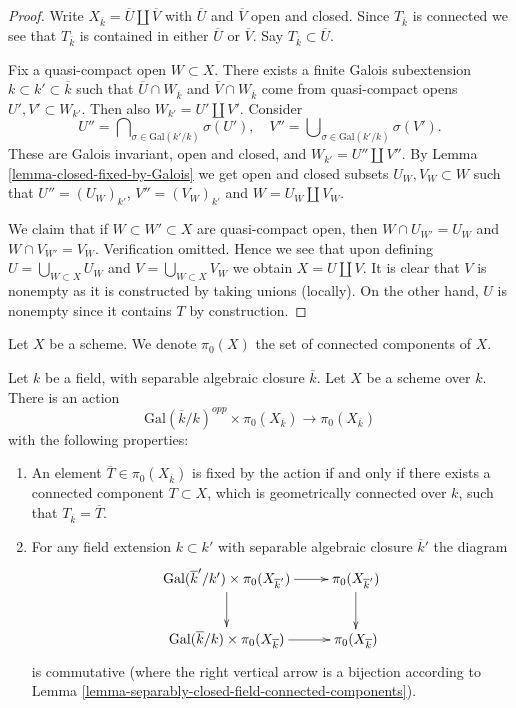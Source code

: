 \begin{proof}
Write $X_{\overline{k}} = \overline{U} \coprod \overline{V}$
with $\overline{U}$ and $\overline{V}$ open and closed.
Since $T_{\overline{k}}$ is connected we see that
$T_{\overline{k}}$ is contained in either $\overline{U}$ or $\overline{V}$.
Say $T_{\overline{k}} \subset \overline{U}$.

\medskip\noindent
Fix a quasi-compact open $W \subset X$. There exists a
finite Galois subextension $k \subset k' \subset \overline{k}$
such that $\overline{U} \cap W_{\overline{k}}$ and
$\overline{V} \cap W_{\overline{k}}$ come from quasi-compact
opens $U', V' \subset W_{k'}$. Then also $W_{k'} = U' \coprod V'$.
Consider
$$
U'' = \bigcap\nolimits_{\sigma \in \text{Gal}(k'/k)} \sigma(U'),
\quad
V'' = \bigcup\nolimits_{\sigma \in \text{Gal}(k'/k)} \sigma(V').
$$
These are Galois invariant, open and closed, and
$W_{k'} = U'' \coprod V''$.
By Lemma \ref{lemma-closed-fixed-by-Galois} we get open and closed subsets
$U_W, V_W \subset W$ such that
$U'' = (U_W)_{k'}$, $V'' = (V_W)_{k'}$ and
$W = U_W \coprod V_W$.

\medskip\noindent
We claim that if $W \subset W' \subset X$ are quasi-compact
open, then $W \cap U_{W'} = U_W$ and $W \cap V_{W'} = V_W$.
Verification omitted.
Hence we see that upon defining $U = \bigcup_{W \subset X} U_W$
and $V = \bigcup_{W \subset X} V_W$ we obtain $X = U \coprod V$.
It is clear that $V$ is nonempty as it is constructed by taking
unions (locally). On the other hand, $U$ is nonempty since it contains
$T$ by construction.
\end{proof}

\noindent
Let $X$ be a scheme. We denote $\pi_0(X)$ the set of connected
components of $X$.

\begin{lemma}
\label{lemma-galois-action-connected-components}
Let $k$ be a field, with separable algebraic closure $\overline{k}$.
Let $X$ be a scheme over $k$.
There is an action
$$
\text{Gal}(\overline{k}/k)^{opp} \times \pi_0(X_{\overline{k}})
\longrightarrow
\pi_0(X_{\overline{k}})
$$
with the following properties:
\begin{enumerate}
\item An element $\overline{T} \in \pi_0(X_{\overline{k}})$
is fixed by the action if and only if there exists a connected component
$T \subset X$, which is geometrically connected over $k$,
such that $T_{\overline{k}} = \overline{T}$.
\item For any field extension $k \subset k'$ with separable
algebraic closure $\overline{k}'$ the diagram
$$
\xymatrix{
\text{Gal}(\overline{k}'/k') \times \pi_0(X_{\overline{k}'})
\ar[r] \ar[d] &
\pi_0(X_{\overline{k}'}) \ar[d] \\
\text{Gal}(\overline{k}/k) \times \pi_0(X_{\overline{k}})
\ar[r] &
\pi_0(X_{\overline{k}})
}
$$
is commutative (where the right vertical arrow is a bijection
according to Lemma \ref{lemma-separably-closed-field-connected-components}).
\end{enumerate}
\end{lemma}

